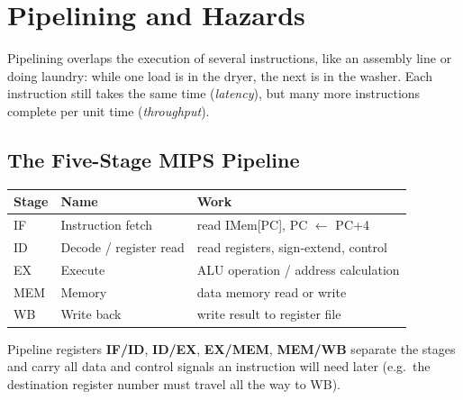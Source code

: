 \chapter{Pipelining and Hazards}

Pipelining overlaps the execution of several instructions, like an assembly
line or doing laundry: while one load is in the dryer, the next is in the
washer. Each instruction still takes the same time (\emph{latency}), but
many more instructions complete per unit time (\emph{throughput}).

\section{The Five-Stage MIPS Pipeline}

\begin{center}
\begin{tabular}{lll}
\toprule
Stage & Name & Work \\
\midrule
IF & Instruction fetch & read IMem[PC], PC $\gets$ PC+4 \\
ID & Decode / register read & read registers, sign-extend, control \\
EX & Execute & ALU operation / address calculation \\
MEM & Memory & data memory read or write \\
WB & Write back & write result to register file \\
\bottomrule
\end{tabular}
\end{center}

Pipeline registers \textbf{IF/ID}, \textbf{ID/EX}, \textbf{EX/MEM},
\textbf{MEM/WB} separate the stages and carry all data and control signals
an instruction will need later (e.g.\ the destination register number must
travel all the way to WB).

